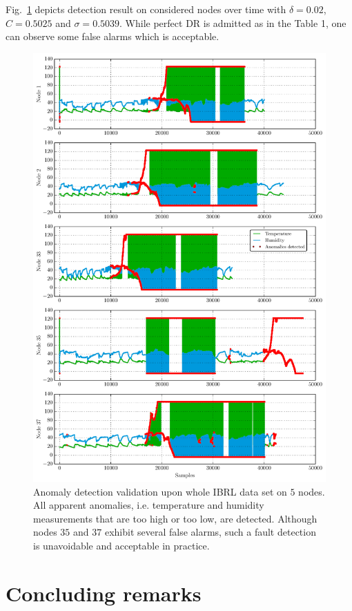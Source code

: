 \documentclass[conference]{IEEEtran}
\theoremstyle{problemstyle}
\begin{document}
Fig.~\ref{fig:time_valid} depicts detection result on considered nodes over time with $\delta=0.02$, $C=0.5025$ and $\sigma=0.5039$. While perfect DR is admitted as in the Table 1, one can observe some false alarms which is acceptable.
\begin{figure}
\centering
\includegraphics[scale=.7]{Figs/time_validation.pdf}
\caption{Anomaly detection validation upon whole IBRL data set on $5$ nodes. All apparent anomalies, i.e. temperature and humidity measurements that are too high or too low, are detected. Although nodes $35$ and $37$ exhibit several false alarms, such a fault detection is unavoidable and acceptable in practice.}
\label{fig:time_valid}
\end{figure}

\section{Concluding remarks}\label{sec:concluding}
\end{document}
